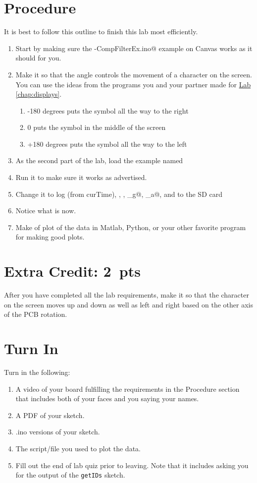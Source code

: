 \section{Procedure}
It is best to follow this outline to finish this lab most efficiently.
\begin{enumerate}
    \item Start by making sure the \lstinline@IMU-CompFilterEx.ino@ example on Canvas works as it should for you.
    \item Make it so that the angle controls the movement of a character on the screen. You can use the ideas 
            from the programs you and your partner made for \hyperref[chap:displays]{Lab \ref*{chap:displays}}.
    \begin{enumerate}
        \item -180 degrees puts the symbol all the way to the right
        \item 0 puts the symbol in the middle of the screen
        \item +180 degrees puts the symbol all the way to the left
    \end{enumerate}
    \item As the second part of the lab, load the example named \lstinline@SDReadWrite@ 
    \item Run it to make sure it works as advertised.
    \item Change it to log \lstinline@t@ (from curTime), \lstinline@ax@, \lstinline@az@, 
            \lstinline@theta_g@, \lstinline@theta_a@, and \lstinline@theta@ to the SD card 
    \item Notice what \lstinline@dt@ is now.
    \item Make of plot of the data in Matlab, Python, or your other favorite program for making good plots.
\end{enumerate}

\section{Extra Credit: 2~pts}
After you have completed all the lab requirements, make it so that the character on the screen moves
up and down as well as left and right based on the other axis of the PCB rotation.

\section{Turn In}
Turn in the following:
\begin{enumerate}
    \item A video of your board fulfilling the requirements in the Procedure section 
            that includes both of your faces and you saying your names.
    \item A PDF of your sketch.
    \item .ino versions of your sketch.
    \item The script/file you used to plot the data.
    \item Fill out the end of lab quiz prior to leaving. Note that it includes asking you 
            for the output of the \lstinline$getIDs$ sketch. 
\end{enumerate}

